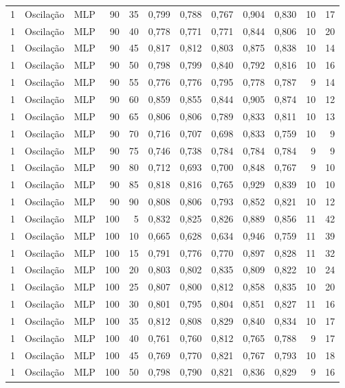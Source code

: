 \begin{longtable}{@{}rllrrrrrrrrr@{}}
1 & Oscilação & MLP & 90 & 35 & 0,799 & 0,788 & 0,767 & 0,904 & 0,830 & 10 & 17 \\
1 & Oscilação & MLP & 90 & 40 & 0,778 & 0,771 & 0,771 & 0,844 & 0,806 & 10 & 20 \\
1 & Oscilação & MLP & 90 & 45 & 0,817 & 0,812 & 0,803 & 0,875 & 0,838 & 10 & 14 \\
1 & Oscilação & MLP & 90 & 50 & 0,798 & 0,799 & 0,840 & 0,792 & 0,816 & 10 & 16 \\
1 & Oscilação & MLP & 90 & 55 & 0,776 & 0,776 & 0,795 & 0,778 & 0,787 & 9 & 14 \\
1 & Oscilação & MLP & 90 & 60 & 0,859 & 0,855 & 0,844 & 0,905 & 0,874 & 10 & 12 \\
1 & Oscilação & MLP & 90 & 65 & 0,806 & 0,806 & 0,789 & 0,833 & 0,811 & 10 & 13 \\
1 & Oscilação & MLP & 90 & 70 & 0,716 & 0,707 & 0,698 & 0,833 & 0,759 & 10 & 9 \\
1 & Oscilação & MLP & 90 & 75 & 0,746 & 0,738 & 0,784 & 0,784 & 0,784 & 9 & 9 \\
1 & Oscilação & MLP & 90 & 80 & 0,712 & 0,693 & 0,700 & 0,848 & 0,767 & 9 & 10 \\
1 & Oscilação & MLP & 90 & 85 & 0,818 & 0,816 & 0,765 & 0,929 & 0,839 & 10 & 10 \\
1 & Oscilação & MLP & 90 & 90 & 0,808 & 0,806 & 0,793 & 0,852 & 0,821 & 10 & 12 \\
1 & Oscilação & MLP & 100 & 5 & 0,832 & 0,825 & 0,826 & 0,889 & 0,856 & 11 & 42 \\
1 & Oscilação & MLP & 100 & 10 & 0,665 & 0,628 & 0,634 & 0,946 & 0,759 & 11 & 39 \\
1 & Oscilação & MLP & 100 & 15 & 0,791 & 0,776 & 0,770 & 0,897 & 0,828 & 11 & 32 \\
1 & Oscilação & MLP & 100 & 20 & 0,803 & 0,802 & 0,835 & 0,809 & 0,822 & 10 & 24 \\
1 & Oscilação & MLP & 100 & 25 & 0,807 & 0,800 & 0,812 & 0,858 & 0,835 & 10 & 20 \\
1 & Oscilação & MLP & 100 & 30 & 0,801 & 0,795 & 0,804 & 0,851 & 0,827 & 11 & 16 \\
1 & Oscilação & MLP & 100 & 35 & 0,812 & 0,808 & 0,829 & 0,840 & 0,834 & 10 & 17 \\
1 & Oscilação & MLP & 100 & 40 & 0,761 & 0,760 & 0,812 & 0,765 & 0,788 & 9 & 17 \\
1 & Oscilação & MLP & 100 & 45 & 0,769 & 0,770 & 0,821 & 0,767 & 0,793 & 10 & 18 \\
1 & Oscilação & MLP & 100 & 50 & 0,798 & 0,790 & 0,821 & 0,836 & 0,829 & 9 & 16 \\

\end{longtable}
